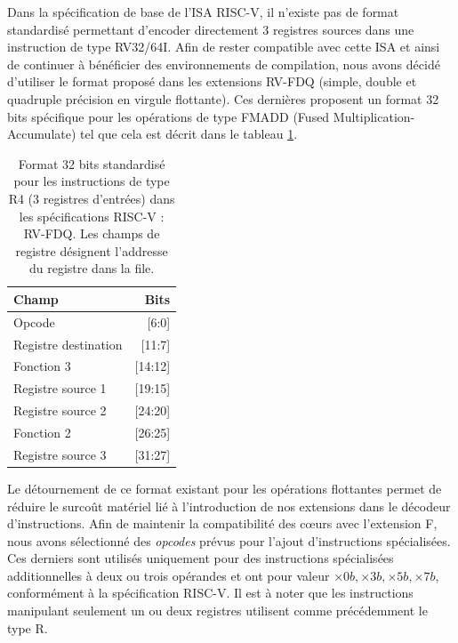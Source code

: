 \documentclass[../main.tex]{subfiles}
\begin{document}
Dans la spécification de base de l'ISA RISC-V, il n'existe pas de format standardisé permettant d'encoder directement 3 registres sources dans une instruction de type RV32/64I.
Afin de rester compatible avec cette ISA et ainsi de continuer à bénéficier des environnements de compilation, nous avons décidé d'utiliser le format proposé dans les extensions RV-FDQ (simple, double et quadruple précision en virgule flottante).
Ces dernières proposent un format 32 bits spécifique pour les opérations de type FMADD (Fused Multiplication-Accumulate) tel que cela est décrit dans le tableau \ref{R4_instruction}.



\begin{table}[]
    \centering
    \begin{tabular}{l|r}
        \toprule
         \textbf{Champ} & \textbf{Bits}  \\
         \bottomrule
         Opcode                 & [6:0]  \\
         Registre destination   & [11:7]  \\
         Fonction 3             & [14:12]  \\
         Registre source 1      & [19:15]  \\
         Registre source 2      & [24:20]  \\
         Fonction 2             & [26:25]  \\
         Registre source 3      & [31:27]  \\
        \bottomrule
    \end{tabular}
    \caption{Format 32 bits standardisé pour les instructions de type R4 (3 registres d'entrées) dans les spécifications RISC-V : RV-FDQ. Les champs de registre désignent l'addresse du registre dans la file.}
    \label{R4_instruction}
\end{table}
Le détournement de ce format existant pour les opérations flottantes permet de réduire le surcoût matériel lié à l'introduction de nos extensions dans le décodeur d'instructions.
Afin de maintenir la compatibilité des cœurs avec l'extension F, nous avons sélectionné des \textit{opcodes} prévus pour l'ajout d'instructions spécialisées.
Ces derniers sont utilisés uniquement pour des instructions spécialisées additionnelles à deux ou trois opérandes et ont pour valeur $\times0b, \times3b, \times5b, \times7b$, conformément à la spécification RISC-V.
Il est à noter que les instructions manipulant seulement un ou deux registres utilisent comme précédemment le type R.
\end{document}
